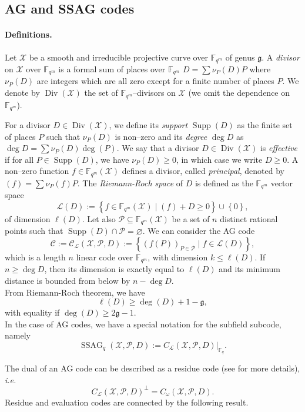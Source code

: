 \documentclass[a4paper]{article}
\theoremstyle{definition}
\theoremstyle{remark}
\newcommand{\calP}{\mathcal{P}}
\newcommand{\calL}{\mathcal{L}}
\newcommand{\calC}{\mathcal{C}}
\newcommand{\calX}{\mathcal{X}}
\newcommand{\fqm}{\mathbb{F}_{q^m}}
\newcommand{\fq}{\mathbb{F}_{q}}
\newcommand{\set}[1]{\left\{#1\right\}}
\newcommand{\Supp}{\operatorname{Supp}}
\newcommand{\Div}{\operatorname{Div}}
\newcommand{\ssag}[1]{\operatorname{SSAG}_{q}\left(#1\right)}
\begin{document}
\subsection{AG and SSAG codes} \label{section:AG_codes}

\paragraph{Definitions.} Let $\calX$ be a smooth and irreducible projective curve over $\fqm$ of genus $\mathfrak{g}$. A \emph{divisor} on $\calX$ over $\fqm$ is a formal sum of places over $\fqm$ $D=\sum \nu_P(D) P$ where $\nu_P(D)$ are integers which are all zero except for a finite number of places $P$. We denote by $\Div(\calX)$ the set of $\fqm$--divisors on $\calX$ (we omit the dependence on $\fqm$).

For a divisor $D \in \Div(\calX)$, we define its \emph{support} $\Supp(D)$ as the finite set of places $P$ such that $\nu_P(D)$ is non--zero and its \emph{degree} $\deg D$ as $\deg D=\sum \nu_P(D) \deg(P)$. We say that a divisor $D \in \Div(\calX)$ is \emph{effective} if for all $P \in \Supp(D)$, we have $\nu_P(D) \geq 0$, in which case we write $D \geq 0$.
A non--zero function $f \in \fqm(\calX)$ defines a divisor, called \emph{principal}, denoted by $(f)=\sum \nu_P(f) P$. The \emph{Riemann-Roch space} of $D$ is defined as the $\fqm$ vector space
$$ \calL(D) := \set{f \in \fqm(\calX) \mid (f) + D \geq 0} \cup \set{0},$$
of dimension $\ell(D)$.
Let also $\calP \subseteq \fqm(\calX)$ be a set of $n$ distinct rational points such that $\Supp(D) \cap \calP = \varnothing$.
We can consider the AG code 
$$\calC := \calC_{\calL}(\calX,\calP,D) := \set{\left(f(P)\right)_{P \in \calP} \mid f \in \calL(D)},$$
which is a length $n$ linear code over $\fqm$, with dimension $k \leq \ell(D)$. If $n \geq \deg D$, then its dimension is exactly equal to $\ell(D)$ and its minimum distance is bounded from below by $n-\deg D$.\\
From Riemann-Roch theorem, we have
$$ \ell(D) \geq \deg(D) +1 - \mathfrak{g},$$ 
with equality if $\deg(D) \geq 2\mathfrak{g}-1$.\\
In the case of AG codes, we have a special notation for the subfield subcode, namely
\[\ssag{\calX,\calP,D} := C_{\calL}(\calX,\calP,D)|_{\fq}.\]

The dual of an AG code can be described as a residue code (see \cite{Sti09} for more details), \emph{i.e.}
$$ C_{\calL}(\calX,\calP,D)^{\perp} = C_{\omega}(\calX,\calP,D).$$ 
Residue and evaluation codes are connected by the following result.
\end{document}
